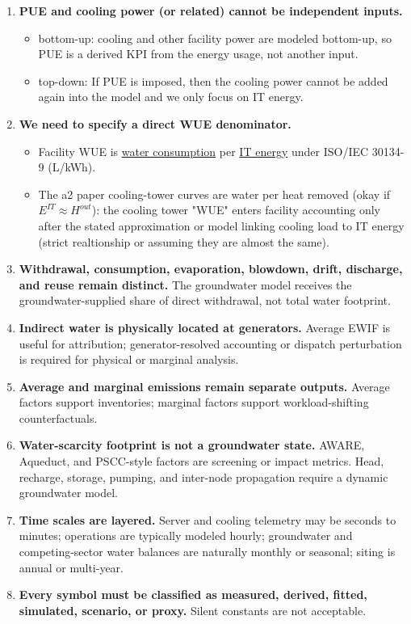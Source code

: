 \documentclass[10pt]{article}
\begin{document}
\begin{enumerate}
\item \textbf{PUE and cooling power (or related) cannot be independent inputs.} 
\begin{itemize}
    \item bottom-up: cooling and other facility power are modeled bottom-up, so PUE is a derived KPI from the energy usage, not another input. 
    \item top-down: If PUE is imposed, then the cooling power cannot be added again into the model and we only focus on IT energy.
\end{itemize}

\item \textbf{We need to specify a direct WUE denominator.} 
\begin{itemize}
    \item  Facility WUE is \underline{water consumption} per \underline{IT energy} under ISO/IEC 30134-9 \cite{isoWUE} (L/kWh). 
    \item The a2 paper cooling-tower curves are water per heat removed (okay if $E^{IT}\approx H^{out}$): the cooling tower "WUE" enters facility accounting only after the stated approximation or model linking cooling load to IT energy (strict realtionship or assuming they are almost the same).
\end{itemize}

\item \textbf{Withdrawal, consumption, evaporation, blowdown, drift, discharge, and reuse remain distinct.} The groundwater model receives the groundwater-supplied share of direct withdrawal, not total water footprint.
\item \textbf{Indirect water is physically located at generators.} Average EWIF is useful for attribution; generator-resolved accounting or dispatch perturbation is required for physical or marginal analysis.
\item \textbf{Average and marginal emissions remain separate outputs.} Average factors support inventories; marginal factors support workload-shifting counterfactuals.
\item \textbf{Water-scarcity footprint is not a groundwater state.} AWARE, Aqueduct, and PSCC-style factors are screening or impact metrics. Head, recharge, storage, pumping, and inter-node propagation require a dynamic groundwater model.
\item \textbf{Time scales are layered.} Server and cooling telemetry may be seconds to minutes; operations are typically modeled hourly; groundwater and competing-sector water balances are naturally monthly or seasonal; siting is annual or multi-year.
\item \textbf{Every symbol must be classified as measured, derived, fitted, simulated, scenario, or proxy.} Silent constants are not acceptable.
\end{enumerate}
\end{document}
